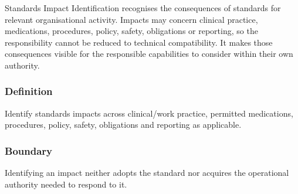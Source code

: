Standards Impact Identification recognises the consequences of standards for relevant organisational activity. Impacts may concern clinical practice, medications, procedures, policy, safety, obligations or reporting, so the responsibility cannot be reduced to technical compatibility. It makes those consequences visible for the responsible capabilities to consider within their own authority.

\subsubsection*{Definition}

Identify standards impacts across clinical/\allowbreak{}work practice, permitted medications, procedures, policy, safety, obligations and reporting as applicable.

\subsubsection*{Boundary}

Identifying an impact neither adopts the standard nor acquires the operational authority needed to respond to it.

